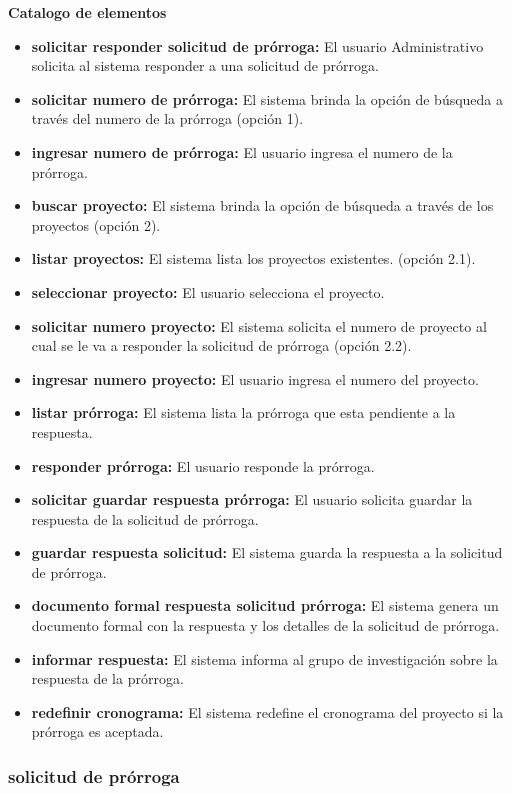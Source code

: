 \documentclass[12pt,oneside,letterpaper]{report}
\begin{document}
\textbf{Catalogo de elementos}
\begin{itemize}
  \item \textbf{solicitar responder solicitud de prórroga:} El usuario Administrativo solicita al sistema responder a una solicitud de prórroga.
  \item \textbf{solicitar numero de prórroga:} El sistema brinda la opción de búsqueda a través del numero de la prórroga (opción 1).
  \item \textbf{ingresar numero de prórroga:} El usuario ingresa el numero de la prórroga.
  \item \textbf{buscar proyecto:} El sistema brinda la opción de búsqueda a través de los proyectos (opción 2).
  \item \textbf{listar proyectos:} El sistema lista los proyectos existentes. (opción 2.1).
  \item \textbf{seleccionar proyecto:} El usuario selecciona el proyecto.
  \item \textbf{solicitar numero proyecto:} El sistema solicita el numero de proyecto al cual se le va a responder la solicitud de prórroga (opción 2.2).
  \item \textbf{ingresar numero  proyecto:} El usuario ingresa el numero del proyecto.
  \item \textbf{listar prórroga:} El sistema lista la prórroga que esta pendiente a la respuesta.
  \item \textbf{responder prórroga:} El usuario responde la prórroga.
  \item \textbf{solicitar guardar respuesta prórroga:} El usuario solicita guardar la respuesta de la solicitud de prórroga.
  \item \textbf{guardar respuesta solicitud:} El sistema guarda la respuesta a la solicitud de prórroga.
  \item \textbf{documento formal respuesta solicitud prórroga:} El sistema genera un documento formal con la respuesta y los detalles de la solicitud de prórroga.
  \item \textbf{informar respuesta:} El sistema informa al grupo de investigación sobre la respuesta de la prórroga.
  \item \textbf{redefinir cronograma:} El sistema redefine el cronograma del proyecto si la prórroga es aceptada.
\end{itemize}


\subsubsection{solicitud de prórroga}
\end{document}
